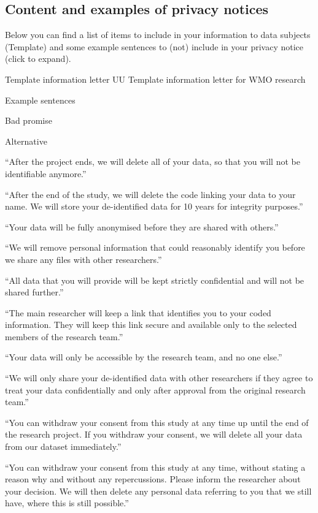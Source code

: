 \documentclass[
]{book}
\begin{document}
\hypertarget{content-and-examples-of-privacy-notices}{%
\subsection{Content and examples of privacy notices}\label{content-and-examples-of-privacy-notices}}

Below you can find a list of items to include in your information to data
subjects (Template) and some example sentences to (not) include in your privacy
notice (click to expand).

Template information letter UU
Template information letter for WMO research

Example sentences

Bad promise

Alternative

``After the project ends, we will delete all of your data, so that you will not be identifiable anymore.''

``After the end of the study, we will delete the code linking your data to your name. We will store your de-identified data for 10 years for integrity purposes.''

``Your data will be fully anonymised before they are shared with others.''

``We will remove personal information that could reasonably identify you before we share any files with other researchers.''

``All data that you will provide will be kept strictly confidential and will not be shared further.''

``The main researcher will keep a link that identifies you to your coded information. They will keep this link secure and available only to the selected members of the research team.''

``Your data will only be accessible by the research team, and no one else.''

``We will only share your de-identified data with other researchers if they agree to treat your data confidentially and only after approval from the original research team.''

``You can withdraw your consent from this study at any time up until the end of the research project. If you withdraw your consent, we will delete all your data from our dataset immediately.''

``You can withdraw your consent from this study at any time, without stating a reason why and without any repercussions. Please inform the researcher about your decision. We will then delete any personal data referring to you that we still have, where this is still possible.''
\end{document}
